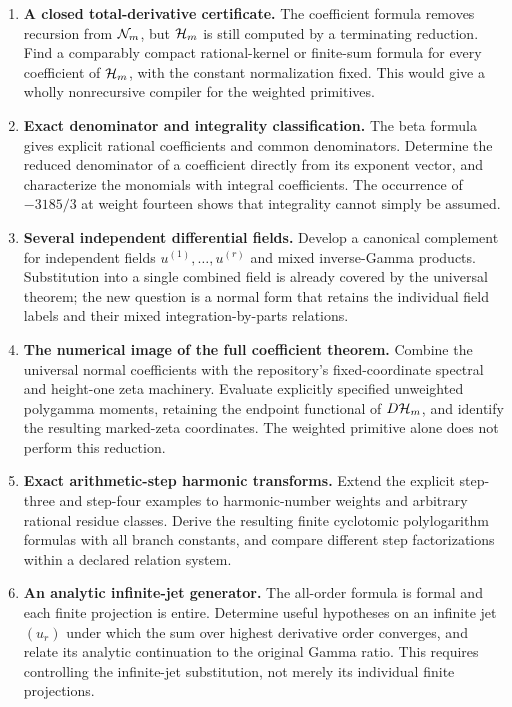 \begin{enumerate}[leftmargin=*,itemsep=7pt]
\item \textbf{A closed total-derivative certificate.}
The coefficient formula removes recursion from $\mathcal N_m$, but $\mathcal H_m$ is still computed by a terminating reduction. Find a comparably compact rational-kernel or finite-sum formula for every coefficient of $\mathcal H_m$, with the constant normalization fixed. This would give a wholly nonrecursive compiler for the weighted primitives.

\item \textbf{Exact denominator and integrality classification.}
The beta formula gives explicit rational coefficients and common denominators. Determine the reduced denominator of a coefficient directly from its exponent vector, and characterize the monomials with integral coefficients. The occurrence of $-3185/3$ at weight fourteen shows that integrality cannot simply be assumed.

\item \textbf{Several independent differential fields.}
Develop a canonical complement for independent fields $u^{(1)},\ldots,u^{(r)}$ and mixed inverse-Gamma products. Substitution into a single combined field is already covered by the universal theorem; the new question is a normal form that retains the individual field labels and their mixed integration-by-parts relations.

\item \textbf{The numerical image of the full coefficient theorem.}
Combine the universal normal coefficients with the repository's fixed-coordinate spectral and height-one zeta machinery. Evaluate explicitly specified unweighted polygamma moments, retaining the endpoint functional of $D\mathcal H_m$, and identify the resulting marked-zeta coordinates. The weighted primitive alone does not perform this reduction.

\item \textbf{Exact arithmetic-step harmonic transforms.}
Extend the explicit step-three and step-four examples to harmonic-number weights and arbitrary rational residue classes. Derive the resulting finite cyclotomic polylogarithm formulas with all branch constants, and compare different step factorizations within a declared relation system.

\item \textbf{An analytic infinite-jet generator.}
The all-order formula is formal and each finite projection is entire. Determine useful hypotheses on an infinite jet $(u_r)$ under which the sum over highest derivative order converges, and relate its analytic continuation to the original Gamma ratio. This requires controlling the infinite-jet substitution, not merely its individual finite projections.


\end{enumerate}
